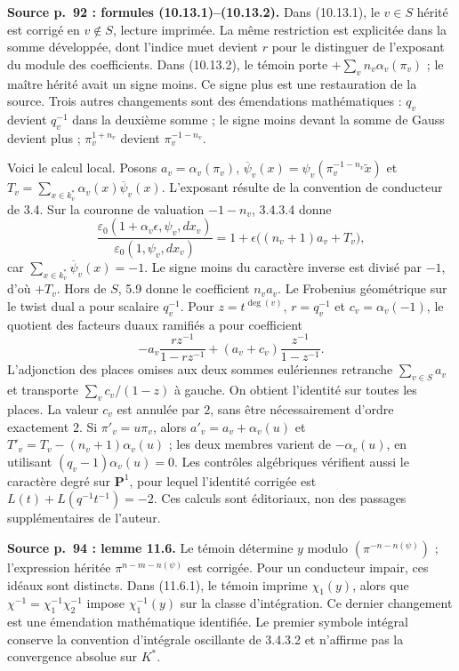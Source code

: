 \documentclass[10pt,letterpaper]{article}
\begin{document}
\begin{description}[style=nextline,leftmargin=2.6em,labelwidth=2.2em,font=\normalfont\bfseries]
\item[E10] \textbf{Source p.~92 : formules (10.13.1)--(10.13.2).} Dans (10.13.1), le \(v\in S\) hérité est corrigé en \(v\notin S\), lecture imprimée. La même restriction est explicitée dans la somme développée, dont l'indice muet devient \(r\) pour le distinguer de l'exposant du module des coefficients. Dans (10.13.2), le témoin porte \(+\sum_v n_v\alpha_v(\pi_v)\) ; le maître hérité avait un signe moins. Ce signe plus est une restauration de la source. Trois autres changements sont des émendations mathématiques : \(q_v\) devient \(q_v^{-1}\) dans la deuxième somme ; le signe moins devant la somme de Gauss devient plus ; \(\pi_v^{1+n_v}\) devient \(\pi_v^{-1-n_v}\).

Voici le calcul local. Posons \(a_v=\alpha_v(\pi_v)\), \(\overline\psi_v(x)=\psi_v(\pi_v^{-1-n_v}\widetilde x)\) et \(T_v=\sum_{x\in k_v^*}\alpha_v(x)\overline\psi_v(x)\). L'exposant résulte de la convention de conducteur de 3.4. Sur la couronne de valuation \(-1-n_v\), 3.4.3.4 donne
\[
 \frac{\varepsilon_0(1+\alpha_v\epsilon,\psi_v,dx_v)}{\varepsilon_0(1,\psi_v,dx_v)}=1+\epsilon\bigl((n_v+1)a_v+T_v\bigr),
\]
car \(\sum_{x\in k_v^*}\overline\psi_v(x)=-1\). Le signe moins du caractère inverse est divisé par \(-1\), d'où \(+T_v\). Hors de \(S\), 5.9 donne le coefficient \(n_va_v\). Le Frobenius géométrique sur le twist dual a pour scalaire \(q_v^{-1}\). Pour \(z=t^{\deg(v)}\), \(r=q_v^{-1}\) et \(c_v=\alpha_v(-1)\), le quotient des facteurs duaux ramifiés a pour coefficient
\[
 -a_v\frac{rz^{-1}}{1-rz^{-1}}+(a_v+c_v)\frac{z^{-1}}{1-z^{-1}}.
\]
L'adjonction des places omises aux deux sommes eulériennes retranche \(\sum_{v\in S}a_v\) et transporte \(\sum_v c_v/(1-z)\) à gauche. On obtient l'identité sur toutes les places. La valeur \(c_v\) est annulée par \(2\), sans être nécessairement d'ordre exactement \(2\). Si \(\pi'_v=u\pi_v\), alors \(a'_v=a_v+\alpha_v(u)\) et \(T'_v=T_v-(n_v+1)\alpha_v(u)\) ; les deux membres varient de \(-\alpha_v(u)\), en utilisant \((q_v-1)\alpha_v(u)=0\). Les contrôles algébriques vérifient aussi le caractère degré sur \(\mathbf P^1\), pour lequel l'identité corrigée est \(L(t)+L(q^{-1}t^{-1})=-2\). Ces calculs sont éditoriaux, non des passages supplémentaires de l'auteur.

\item[E11] \textbf{Source p.~94 : lemme 11.6.} Le témoin détermine \(y\) modulo \((\pi^{-n-n(\psi)})\) ; l'expression héritée \(\pi^{n-m-n(\psi)}\) est corrigée. Pour un conducteur impair, ces idéaux sont distincts. Dans (11.6.1), le témoin imprime \(\chi_1(y)\), alors que \(\chi^{-1}=\chi_1^{-1}\chi_2^{-1}\) impose \(\chi_1^{-1}(y)\) sur la classe d'intégration. Ce dernier changement est une émendation mathématique identifiée. Le premier symbole intégral conserve la convention d'intégrale oscillante de 3.4.3.2 et n'affirme pas la convergence absolue sur \(K^*\).


\end{description}
\end{document}
